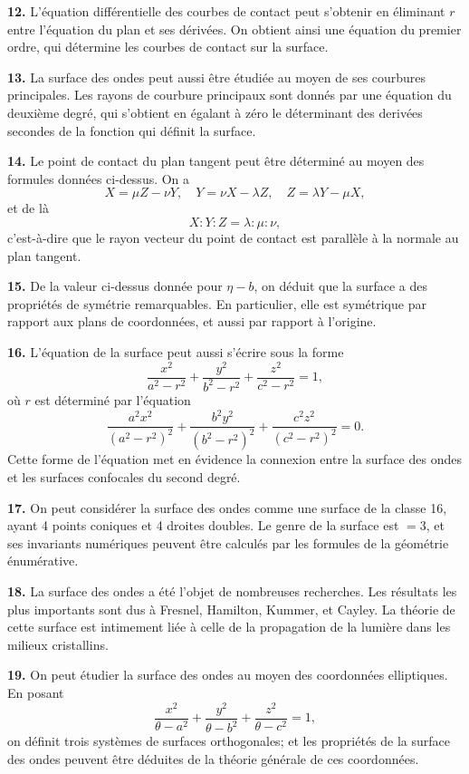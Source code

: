 \documentclass[11pt,a4paper]{book}
\begin{document}
\textbf{12.} L'\'equation diff\'erentielle des courbes de contact peut s'obtenir en
\'eliminant $r$ entre l'\'equation du plan et ses d\'eriv\'ees. On obtient ainsi une
\'equation du premier ordre, qui d\'etermine les courbes de contact sur la surface.

\textbf{13.} La surface des ondes peut aussi \^etre \'etudi\'ee au moyen de ses
courbures principales. Les rayons de courbure principaux sont donn\'es par une
\'equation du deuxi\`eme degr\'e, qui s'obtient en \'egalant \`a z\'ero le d\'eterminant des
deriv\'ees secondes de la fonction qui d\'efinit la surface.

\textbf{14.} Le point de contact du plan tangent peut \^etre d\'etermin\'e au moyen
des formules donn\'ees ci-dessus. On a
\[
X = \mu Z - \nu Y, \quad Y = \nu X - \lambda Z, \quad Z = \lambda Y - \mu X,
\]
et de l\`a
\[
X : Y : Z = \lambda : \mu : \nu,
\]
c'est-\`a-dire que le rayon vecteur du point de contact est parall\`ele \`a la normale au
plan tangent.

\newpage
\textbf{15.} De la valeur ci-dessus donn\'ee pour $\eta - b$, on d\'eduit que la surface
a des propri\'et\'es de sym\'etrie remarquables. En particulier, elle est sym\'etrique
par rapport aux plans de coordonn\'ees, et aussi par rapport \`a l'origine.

\textbf{16.} L'\'equation de la surface peut aussi s'\'ecrire sous la forme
\[
\frac{x^2}{a^2-r^2} + \frac{y^2}{b^2-r^2} + \frac{z^2}{c^2-r^2} = 1,
\]
o\`u $r$ est d\'etermin\'e par l'\'equation
\[
\frac{a^2x^2}{(a^2-r^2)^2} + \frac{b^2y^2}{(b^2-r^2)^2} + \frac{c^2z^2}{(c^2-r^2)^2} = 0.
\]
Cette forme de l'\'equation met en \'evidence la connexion entre la surface des ondes
et les surfaces confocales du second degr\'e.

\textbf{17.} On peut consid\'erer la surface des ondes comme une surface de la
classe 16, ayant 4 points coniques et 4 droites doubles. Le genre de la surface
est $= 3$, et ses invariants num\'eriques peuvent \^etre calcul\'es par les formules de la
g\'eom\'etrie \'enum\'erative.

\textbf{18.} La surface des ondes a \'et\'e l'objet de nombreuses recherches. Les
r\'esultats les plus importants sont dus \`a Fresnel, Hamilton, Kummer, et Cayley.
La th\'eorie de cette surface est intimement li\'ee \`a celle de la propagation de la
lumi\`ere dans les milieux cristallins.

\textbf{19.} On peut \'etudier la surface des ondes au moyen des coordonn\'ees
elliptiques. En posant
\[
\frac{x^2}{\theta-a^2} + \frac{y^2}{\theta-b^2} + \frac{z^2}{\theta-c^2} = 1,
\]
on d\'efinit trois syst\`emes de surfaces orthogonales; et les propri\'et\'es de la surface
des ondes peuvent \^etre d\'eduites de la th\'eorie g\'en\'erale de ces coordonn\'ees.
\end{document}
